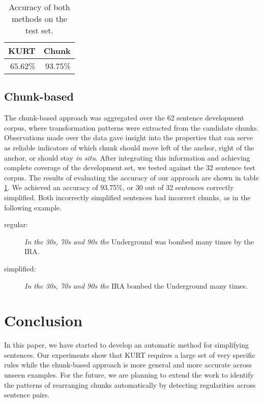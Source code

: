 \documentclass[a4paper,11pt]{article}
\begin{document}
\begin{table}
	\centering
		\begin{tabular}{rr}
		 KURT & Chunk\\
		\hline
		65.62\% & 93.75\%\\ \hline
		\end{tabular}
	\caption{Accuracy of both methods on the test set.}
	\label{tab:acc}
\end{table}

\subsection{Chunk-based}

The chunk-based approach was aggregated over the 62 sentence development corpus, where transformation patterns were extracted from the candidate chunks. Observations made over the data gave insight into the properties that can serve as reliable indicators of which chunk should move left of the anchor,  right of the anchor, or should stay \textit{in situ}. After integrating this information and achieving complete coverage of the development set, we tested against the 32 sentence test corpus. The results of evaluating the accuracy of our approach are shown in table \ref{tab:acc}. We achieved an accuracy of 93.75\%, or 30 out of 32 sentences correctly simplified.  Both incorrectly simplified sentences had incorrect chunks, as in the following example.

\begin{description}
\item[regular:]  \textit{In the 30s, 70s and 90s the} Underground was bombed many times by the IRA.
\item[simplified:] \textit{In the 30s, 70s and 90s the} IRA bombed the Underground many times.
\end{description}



\section{Conclusion}

In this paper, we have started to develop an automatic method for simplifying sentences. Our experiments show that KURT requires a large set of very specific rules while the chunk-based approach is more general and more accurate across unseen examples. For the future, we are planning to extend the work to identify the patterns of rearranging chunks automatically by detecting regularities across sentence pairs.


\end{document}
